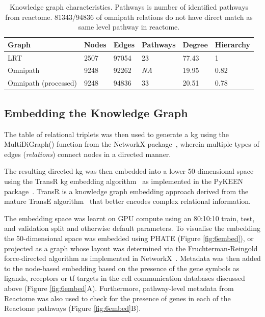 \begingroup %
\renewcommand{\arraystretch}{1.2} %
    \begin{table}
    \centering
        \begin{tabular}{| p{1.8cm} p{1.8cm} p{1.8cm} p{1.8cm} p{1.8cm} p{1.8cm} |}
            \hline
            \textbf{Graph} & \textbf{Nodes} & \textbf{Edges} & \textbf{Pathways} & $\overline{\textbf{Degree}}$ & \textbf{Hierarchy} \\
            \hline\hline
            LRT & 2507 & 97054 & 23 & 77.43 & 1 \\
            \hline
            Omnipath & 9248 & 92262 & \textit{NA} & 19.95 & 0.82 \\
            \hline
            Omnipath (processed) & 9248 & 94836 & 33 & 20.51 & 0.78 \\
            \hline
        \end{tabular}
    \caption{Knowledge graph characteristics. Pathways is number of identified pathways from reactome. 81343/94836 of omnipath relations do not have direct match as same level pathway in reactome.}
    \label{tab:2kg}
    \end{table}
\endgroup

\subsection{Embedding the Knowledge Graph}

The table of relational triplets was then used to generate a \acrshort{kg} using the MultiDiGraph() function from the NetworkX package~\cite{hagberg_exploring_2008}, wherein multiple types of edges (\emph{relations}) connect nodes in a directed manner. 

The resulting directed \acrshort{kg} was then embedded into a lower 50-dimensional space using the TransR \acrshort{kg} embedding algorithm~\cite{zhang_transr_2021} as implemented in the PyKEEN package~\cite{ali_pykeen_2021}. TransR is a knowledge graph embedding approach derived from the mature TransE algorithm~\cite{bordes_translating_2013} that better encodes complex relational information. 

The embedding space was learnt on GPU compute using an 80:10:10 train, test, and validation split and otherwise default parameters.
To visualise the embedding the 50-dimensional space was embedded using PHATE (Figure \ref{fig:6embed}), or projected as a graph whose layout was determined via the Fruchterman-Reingold force-directed algorithm as implemented in NetworkX~\cite{fruchterman_graph_1991}.
Metadata was then added to the node-based embedding based on the presence of the gene symbols as ligands, receptors or \acrshort{tf} targets in the cell communication databases discussed above (Figure \ref{fig:6embed}A). Furthermore, pathway-level metadata from Reactome was also used to check for the presence of genes in each of the Reactome pathways (Figure \ref{fig:6embed}B).


